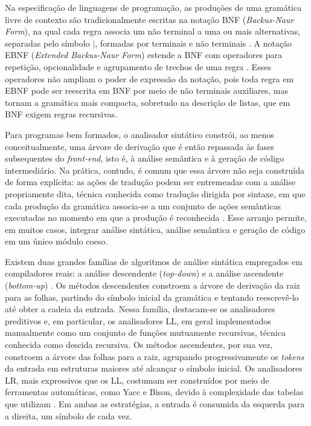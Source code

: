 \documentclass[
    12pt
    ,oneside
    ,a4paper
    ,chapter=TITLE
    ,section=TITLE
    ,sumario=abnt-6027-2012]{abntex2}
\begin{document}
Na especificação de linguagens de programação, as produções de uma gramática livre de
contexto são tradicionalmente escritas na notação BNF (\textit{Backus-Naur Form}), na qual
cada regra associa um não terminal a uma ou mais alternativas, separadas pelo símbolo
$\mid$, formadas por terminais e não terminais \cite{aho2008}. A notação EBNF
(\textit{Extended Backus-Naur Form}) estende a BNF com operadores para repetição,
opcionalidade e agrupamento de trechos de uma regra \cite{iso14977}. Esses operadores não
ampliam o poder de expressão da notação, pois toda regra em EBNF pode ser reescrita em BNF
por meio de não terminais auxiliares, mas tornam a gramática mais compacta, sobretudo na
descrição de listas, que em BNF exigem regras recursivas.

Para programas bem formados, o analisador sintático constrói, ao menos conceitualmente, uma
árvore de derivação que é então repassada às fases subsequentes do \textit{front-end}, isto é,
à análise semântica e à geração de código intermediário. Na prática, contudo, é comum que essa
árvore não seja construída de forma explícita: as ações de tradução podem ser entremeadas com a
análise propriamente dita, técnica conhecida como tradução dirigida por sintaxe, em
que cada produção da gramática associa-se a um conjunto de ações semânticas executadas no
momento em que a produção é reconhecida \cite{aho2008}. Esse arranjo permite, em muitos casos,
integrar análise sintática, análise semântica e geração de código em um único módulo coeso.

Existem duas grandes famílias de algoritmos de análise sintática empregados em compiladores
reais: a análise descendente (\textit{top-down}) e a análise ascendente
(\textit{bottom-up}) \cite{aho2008}. Os métodos descendentes constroem a árvore de derivação
da raiz para as folhas, partindo do símbolo inicial da gramática e tentando reescrevê-lo até
obter a cadeia da entrada. Nessa família, destacam-se os analisadores preditivos e, em
particular, os analisadores LL, em geral implementados manualmente como um conjunto de funções
mutuamente recursivas, técnica conhecida como descida recursiva. Os métodos ascendentes, por
sua vez, constroem a árvore das folhas para a raiz, agrupando progressivamente os
\textit{tokens} da entrada em estruturas maiores até alcançar o símbolo inicial. Os
analisadores LR, mais expressivos que os LL, costumam ser construídos por meio de ferramentas
automáticas, como Yacc e Bison, devido à complexidade das tabelas que utilizam \cite{aho2008}.
Em ambas as estratégias, a entrada é consumida da esquerda para a direita, um símbolo de cada
vez.
\end{document}
